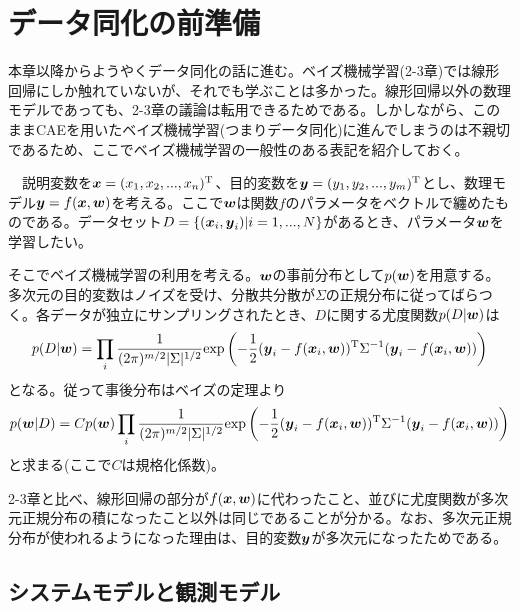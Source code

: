 \documentclass[dvipdfmx, 9pt, a4paper]{jsarticle}
\newcommand{\bm}[1]{{\mbox{\boldmath $#1$}}}
\begin{document}
\section{データ同化の前準備}
本章以降からようやくデータ同化の話に進む。ベイズ機械学習(2-3章)では線形回帰にしか触れていないが、それでも学ぶことは多かった。線形回帰以外の数理モデルであっても、2-3章の議論は転用できるためである。しかしながら、このままCAEを用いたベイズ機械学習(つまりデータ同化)に進んでしまうのは不親切であるため、ここでベイズ機械学習の一般性のある表記を紹介しておく。
\begin{tcolorbox}[title=ベイズ機械学習の一般的表記]
　説明変数を$\bm x=(x_1, x_2, ..., x_n)^{\rm T}$、目的変数を$\bm y=(y_1, y_2, ..., y_m)^{\rm T}$とし、数理モデル$\bm y=f(\bm x, \bm w)$を考える。ここで$\bm w$は関数$f$のパラメータをベクトルで纏めたものである。データセット$D=\{ (\bm x_i, \bm y_i)|i=1,...,N \}$があるとき、パラメータ$\bm w$を学習したい。\par
そこでベイズ機械学習の利用を考える。$\bm w$の事前分布として$p(\bm w)$を用意する。多次元の目的変数はノイズを受け、分散共分散が$\Sigma$の正規分布に従ってばらつく。各データが独立にサンプリングされたとき、$D$に関する尤度関数$p(D|\bm w)$は
\begin{equation}
p(D|\bm w)=\prod_i \frac{1}{(2\pi)^{m/2}|\Sigma|^{1/2}}{\rm exp}\left(
-\frac{1}{2}(\bm y_i - f(\bm x_i, \bm w))^{\rm T}\Sigma^{-1}(\bm y_i - f(\bm x_i, \bm w))
\right) \notag
\end{equation}
となる。従って事後分布はベイズの定理より
\begin{equation}
p(\bm w|D)=Cp(\bm w)\prod_i \frac{1}{(2\pi)^{m/2}|\Sigma|^{1/2}}{\rm exp}\left(
-\frac{1}{2}(\bm y_i - f(\bm x_i, \bm w))^{\rm T}\Sigma^{-1}(\bm y_i - f(\bm x_i, \bm w))
\right) \notag
\end{equation}
と求まる(ここで$C$は規格化係数)。
\end{tcolorbox}
2-3章と比べ、線形回帰の部分が$f(\bm x, \bm w)$に代わったこと、並びに尤度関数が多次元正規分布の積になったこと以外は同じであることが分かる。なお、多次元正規分布が使われるようになった理由は、目的変数$\bm y$が多次元になったためである。

\subsection{システムモデルと観測モデル}
\end{document}
